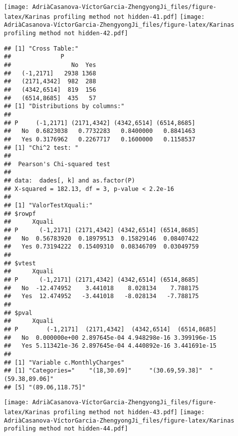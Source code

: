 \documentclass[
]{article}
\begin{document}
\texttt{[image: AdriàCasanova-VíctorGarcia-ZhengyongJi\_files/figure-latex/Karinas profiling method not hidden-41.pdf]}
\texttt{[image: AdriàCasanova-VíctorGarcia-ZhengyongJi\_files/figure-latex/Karinas profiling method not hidden-42.pdf]}

\begin{verbatim}
## [1] "Cross Table:"
##              P
##                 No  Yes
##   (-1,2171]   2938 1368
##   (2171,4342]  982  288
##   (4342,6514]  819  156
##   (6514,8685]  435   57
## [1] "Distributions by columns:"
##      
## P     (-1,2171] (2171,4342] (4342,6514] (6514,8685]
##   No  0.6823038   0.7732283   0.8400000   0.8841463
##   Yes 0.3176962   0.2267717   0.1600000   0.1158537
## [1] "Chi^2 test: "
## 
##  Pearson's Chi-squared test
## 
## data:  dades[, k] and as.factor(P)
## X-squared = 182.13, df = 3, p-value < 2.2e-16
## 
## [1] "ValorTestXquali:"
## $rowpf
##      Xquali
## P      (-1,2171] (2171,4342] (4342,6514] (6514,8685]
##   No  0.56783920  0.18979513  0.15829146  0.08407422
##   Yes 0.73194222  0.15409310  0.08346709  0.03049759
## 
## $vtest
##      Xquali
## P      (-1,2171] (2171,4342] (4342,6514] (6514,8685]
##   No  -12.474952    3.441018    8.028134    7.788175
##   Yes  12.474952   -3.441018   -8.028134   -7.788175
## 
## $pval
##      Xquali
## P        (-1,2171]  (2171,4342]  (4342,6514]  (6514,8685]
##   No  0.000000e+00 2.897645e-04 4.948298e-16 3.399196e-15
##   Yes 5.113421e-36 2.897645e-04 4.440892e-16 3.441691e-15
## 
## [1] "Variable c.MonthlyCharges"
## [1] "Categories="    "(18,30.69]"     "(30.69,59.38]"  "(59.38,89.06]" 
## [5] "(89.06,118.75]"
\end{verbatim}

\texttt{[image: AdriàCasanova-VíctorGarcia-ZhengyongJi\_files/figure-latex/Karinas profiling method not hidden-43.pdf]}
\texttt{[image: AdriàCasanova-VíctorGarcia-ZhengyongJi\_files/figure-latex/Karinas profiling method not hidden-44.pdf]}
\end{document}
